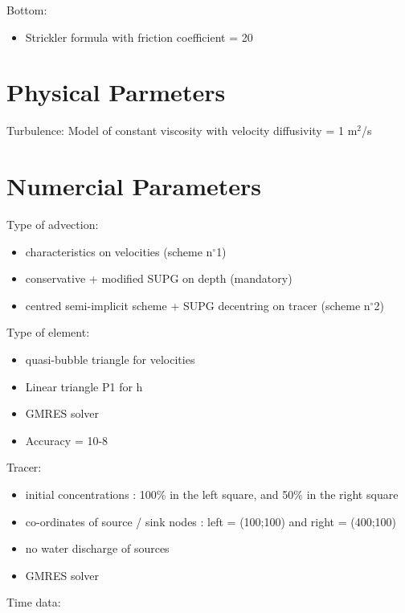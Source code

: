 Bottom:

\begin{itemize}
\item Strickler formula with friction coefficient = 20
\end{itemize}

\section{Physical Parmeters}

Turbulence: Model of constant viscosity with velocity diffusivity = 1 m${}^{2}$/s

\section{Numercial Parameters}

Type of advection:
\begin{itemize}
\item  characteristics on velocities (scheme n$\mathrm{{}^\circ}$1)
\item  conservative + modified SUPG on depth (mandatory)
\item  centred semi-implicit scheme + SUPG decentring on tracer (scheme n$\mathrm{{}^\circ}$2)
\end{itemize}

Type of element:
\begin{itemize}
\item  quasi-bubble triangle for velocities
\item  Linear triangle P1 for h
\end{itemize}

\begin{itemize}
\item  GMRES solver
\item  Accuracy = 10-8
\end{itemize}

Tracer:

\begin{itemize}
\item  initial concentrations : 100\% in the left square, and 50\% in the right square
\item  co-ordinates of source / sink nodes : left = (100;100) and right = (400;100)
\item  no water discharge of sources
\item  GMRES solver
\end{itemize}

Time data:


